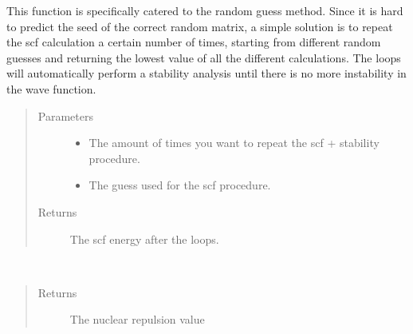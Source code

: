 \documentclass[letterpaper,10pt,english]{sphinxmanual}
\begin{document}
\begin{fulllineitems}
\begin{fulllineitems}
\end{fulllineitems}


\begin{fulllineitems}
\label{\detokenize{Complex_GHF:ghf.complex_GHF.ComplexGHF.loop_calculations}}
This function is specifically catered to the random guess method. Since it is hard to predict the seed of the
correct random matrix, a simple solution is to repeat the scf calculation a certain number of times, starting
from different random guesses and returning the lowest value of all the different calculations. The loops will
automatically perform a stability analysis until there is no more instability in the wave function.
\begin{quote}\begin{description}
\item[{Parameters}] \leavevmode\begin{itemize}
\item {} 
 \textendash{} The amount of times you want to repeat the scf + stability procedure.

\item {} 
 \textendash{} The guess used for the scf procedure.

\end{itemize}

\item[{Returns}] \leavevmode
The scf energy after the loops.

\end{description}\end{quote}

\end{fulllineitems}


\begin{fulllineitems}
\label{\detokenize{Complex_GHF:ghf.complex_GHF.ComplexGHF.nuc_rep}}~\begin{quote}\begin{description}
\item[{Returns}] \leavevmode
The nuclear repulsion value


\end{description}
\end{quote}
\end{fulllineitems}
\end{fulllineitems}
\end{document}
